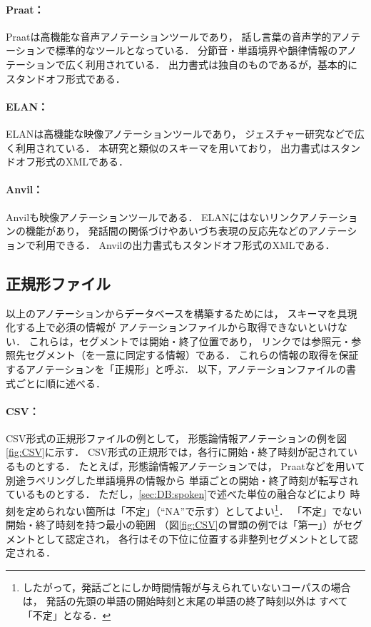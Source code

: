 \documentclass[japanese]{jnlp_1.4}
\begin{document}
\paragraph{Praat：}
Praatは高機能な音声アノテーションツールであり，
話し言葉の音声学的アノテーションで標準的なツールとなっている．
分節音・単語境界や韻律情報のアノテーションで広く利用されている．
出力書式は独自のものであるが，基本的にスタンドオフ形式である．


\paragraph{ELAN：}
ELANは高機能な映像アノテーションツールであり，
ジェスチャー研究などで広く利用されている．
本研究と類似のスキーマを用いており，
出力書式はスタンドオフ形式のXMLである．

\paragraph{Anvil：}
Anvilも映像アノテーションツールである．
ELANにはないリンクアノテーションの機能があり，
発話間の関係づけやあいづち表現の反応先などのアノテーションで利用できる．
Anvilの出力書式もスタンドオフ形式のXMLである．



\subsection{正規形ファイル}
\label{sec:Tools:normal}

以上のアノテーションからデータベースを構築するためには，
スキーマを具現化する上で必須の情報が
アノテーションファイルから取得できないといけない．
これらは，セグメントでは開始・終了位置であり，
リンクでは参照元・参照先セグメント（を一意に同定する情報）である．
これらの情報の取得を保証するアノテーションを「正規形」と呼ぶ．
以下，アノテーションファイルの書式ごとに順に述べる．

\paragraph{CSV：}

CSV形式の正規形ファイルの例として，
形態論情報アノテーションの例を図\ref{fig:CSV}に示す．
CSV形式の正規形では，各行に開始・終了時刻が記されているものとする．
たとえば，形態論情報アノテーションでは，
Praatなどを用いて別途ラベリングした単語境界の情報から
単語ごとの開始・終了時刻が転写されているものとする．
ただし，\ref{sec:DB:spoken}で述べた単位の融合などにより
時刻を定められない箇所は「不定」（``NA''で示す）としてよい\footnote{
 したがって，発話ごとにしか時間情報が与えられていないコーパスの場合は，
発話の先頭の単語の開始時刻と末尾の単語の終了時刻以外は
すべて「不定」となる．}．
「不定」でない開始・終了時刻を持つ最小の範囲
（図\ref{fig:CSV}の冒頭の例では「第一」）がセグメントとして認定され，
各行はその下位に位置する非整列セグメントとして認定される．
\end{document}

